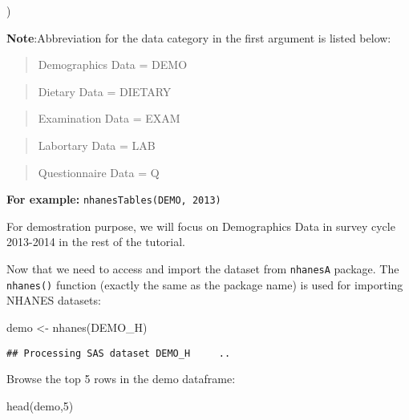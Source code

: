 \documentclass[
]{book}
\newenvironment{Shaded}{\begin{snugshade}}{\end{snugshade}}
\newcommand{\DecValTok}[1]{\textcolor[rgb]{0.00,0.00,0.81}{#1}}
\newcommand{\FunctionTok}[1]{\textcolor[rgb]{0.00,0.00,0.00}{#1}}
\newcommand{\NormalTok}[1]{#1}
\newcommand{\OtherTok}[1]{\textcolor[rgb]{0.56,0.35,0.01}{#1}}
\newcommand{\StringTok}[1]{\textcolor[rgb]{0.31,0.60,0.02}{#1}}
\begin{document}
)

\textbf{Note}:Abbreviation for the data category in the first argument is listed below:

\begin{quote}
Demographics Data = DEMO
\end{quote}

\begin{quote}
Dietary Data = DIETARY
\end{quote}

\begin{quote}
Examination Data = EXAM
\end{quote}

\begin{quote}
Labortary Data = LAB
\end{quote}

\begin{quote}
Questionnaire Data = Q
\end{quote}

\textbf{For example:} \texttt{nhanesTables(\textquotesingle{}DEMO\textquotesingle{},\ 2013)}

For demostration purpose, we will focus on Demographics Data in survey cycle 2013-2014 in the rest of the tutorial.

Now that we need to access and import the dataset from \texttt{nhanesA} package. The \texttt{nhanes()} function (exactly the same as the package name) is used for importing NHANES datasets:

\begin{Shaded}
\begin{Highlighting}[]
\NormalTok{demo }\OtherTok{\textless{}{-}} \FunctionTok{nhanes}\NormalTok{(}\StringTok{\textquotesingle{}DEMO\_H\textquotesingle{}}\NormalTok{)}
\end{Highlighting}
\end{Shaded}

\begin{verbatim}
## Processing SAS dataset DEMO_H     ..
\end{verbatim}

Browse the top 5 rows in the demo dataframe:

\begin{Shaded}
\begin{Highlighting}[]
\FunctionTok{head}\NormalTok{(demo,}\DecValTok{5}\NormalTok{)}
\end{Highlighting}
\end{Shaded}
\end{document}
